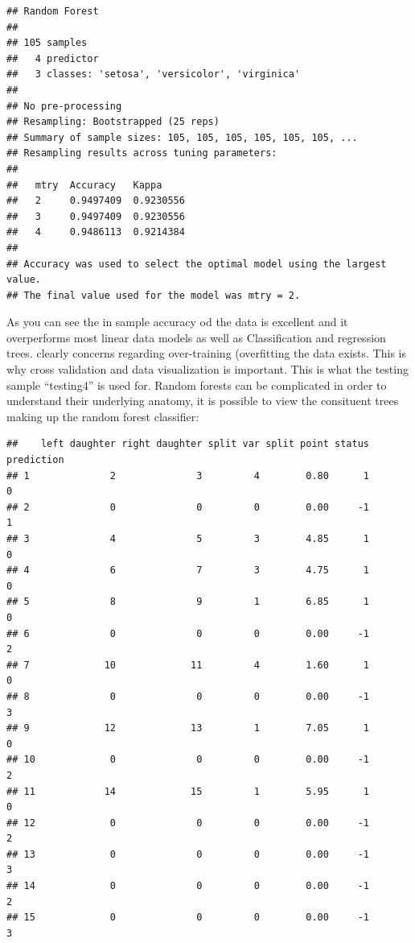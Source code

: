 \documentclass[
]{article}
\newenvironment{Shaded}{\begin{snugshade}}{\end{snugshade}}
\newcommand{\DataTypeTok}[1]{\textcolor[rgb]{0.13,0.29,0.53}{#1}}
\newcommand{\DecValTok}[1]{\textcolor[rgb]{0.00,0.00,0.81}{#1}}
\newcommand{\KeywordTok}[1]{\textcolor[rgb]{0.13,0.29,0.53}{\textbf{#1}}}
\newcommand{\NormalTok}[1]{#1}
\newcommand{\OperatorTok}[1]{\textcolor[rgb]{0.81,0.36,0.00}{\textbf{#1}}}
\begin{document}
\begin{verbatim}
## Random Forest 
## 
## 105 samples
##   4 predictor
##   3 classes: 'setosa', 'versicolor', 'virginica' 
## 
## No pre-processing
## Resampling: Bootstrapped (25 reps) 
## Summary of sample sizes: 105, 105, 105, 105, 105, 105, ... 
## Resampling results across tuning parameters:
## 
##   mtry  Accuracy   Kappa    
##   2     0.9497409  0.9230556
##   3     0.9497409  0.9230556
##   4     0.9486113  0.9214384
## 
## Accuracy was used to select the optimal model using the largest value.
## The final value used for the model was mtry = 2.
\end{verbatim}

As you can see the in sample accuracy od the data is excellent and it
overperforms most linear data models as well as Classification and
regression trees. clearly concerns regarding over-training (overfitting
the data exists. This is why cross validation and data visualization is
important. This is what the testing sample ``testing4'' is used for.
Random forests can be complicated in order to understand their
underlying anatomy, it is possible to view the consituent trees making
up the random forest classifier:

\begin{Shaded}
\end{Shaded}

\begin{verbatim}
##    left daughter right daughter split var split point status prediction
## 1              2              3         4        0.80      1          0
## 2              0              0         0        0.00     -1          1
## 3              4              5         3        4.85      1          0
## 4              6              7         3        4.75      1          0
## 5              8              9         1        6.85      1          0
## 6              0              0         0        0.00     -1          2
## 7             10             11         4        1.60      1          0
## 8              0              0         0        0.00     -1          3
## 9             12             13         1        7.05      1          0
## 10             0              0         0        0.00     -1          2
## 11            14             15         1        5.95      1          0
## 12             0              0         0        0.00     -1          2
## 13             0              0         0        0.00     -1          3
## 14             0              0         0        0.00     -1          2
## 15             0              0         0        0.00     -1          3
\end{verbatim}
\end{document}
